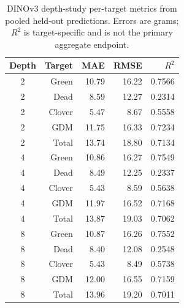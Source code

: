 \documentclass[pdflatex,a4paper,sn-nature]{sn-jnl}
\begin{document}
\begin{table}[ht]
\centering
\caption{DINOv3 depth-study per-target metrics from pooled held-out predictions. Errors are grams; $R^2$ is target-specific and is not the primary aggregate endpoint.}
\label{tab:depth}
\begin{tabular}{crrrr}
\toprule Depth & Target & MAE & RMSE & $R^2$ \\
\midrule
2 & Green & 10.79 & 16.22 & 0.7566 \\
2 & Dead & 8.59 & 12.27 & 0.2314 \\
2 & Clover & 5.47 & 8.67 & 0.5558 \\
2 & GDM & 11.75 & 16.33 & 0.7234 \\
2 & Total & 13.74 & 18.80 & 0.7134 \\
4 & Green & 10.86 & 16.27 & 0.7549 \\
4 & Dead & 8.49 & 12.25 & 0.2337 \\
4 & Clover & 5.43 & 8.59 & 0.5638 \\
4 & GDM & 11.97 & 16.52 & 0.7168 \\
4 & Total & 13.87 & 19.03 & 0.7062 \\
8 & Green & 10.87 & 16.26 & 0.7552 \\
8 & Dead & 8.40 & 12.08 & 0.2548 \\
8 & Clover & 5.43 & 8.49 & 0.5738 \\
8 & GDM & 12.00 & 16.55 & 0.7159 \\
8 & Total & 13.96 & 19.20 & 0.7011 \\
\bottomrule
\end{tabular}
\end{table}
\end{document}
